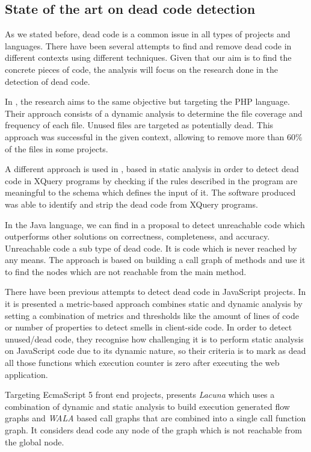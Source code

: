 \documentclass{uvamscse}
\begin{document}
\subsection{State of the art on dead code detection}

As we stated before, dead code is a common issue in all types of projects and languages. There have been several attempts to find and remove dead code in different contexts using different techniques. Given that our aim is to find the concrete pieces of code, the analysis will focus on the research done in the detection of dead code.

In \cite{DeadCodePHP}, the research aims to the same objective but targeting the PHP language. Their approach consists of a dynamic analysis to determine the file coverage and frequency of each file. Unused files are targeted as potentially dead. This approach was successful in the given context, allowing to remove more than 60\% of the files in some projects.

A different approach is used in \cite{DeadCodeXQuery}, based in static analysis in order to detect dead code in XQuery programs by checking if the rules described in the program are meaningful to the schema which defines the input of it. The software produced was able to identify and strip the dead code from XQuery programs.

In the Java language, we can find in \cite{JavaDeadCode} a proposal to detect unreachable code which outperforms other solutions on correctness, completeness, and accuracy. Unreachable code a sub type of dead code. It is code which is never reached by any means. The approach is based on building a call graph of methods and use it to find the nodes which are not reachable from the main method.

There have been previous attempts to detect dead code in JavaScript projects. In \cite{JNose} it is presented a metric-based approach combines static and dynamic analysis by setting a combination of metrics and thresholds like the amount of lines of code or number of properties to detect smells in client-side code. In order to detect unused/dead code, they recognise how challenging it is to perform static analysis on JavaScript code due to its dynamic nature, so their criteria is to mark as dead all those functions which execution counter is zero after executing the web application. 

Targeting EcmaScript 5 front end projects, \cite{ieee_s8330226} presents \textit{Lacuna} which uses a combination of dynamic and static analysis to build execution generated flow graphs and \textit{WALA} based call graphs that are combined into a single call function graph. It considers dead code any node of the graph which is not reachable from the global node. 
\end{document}
